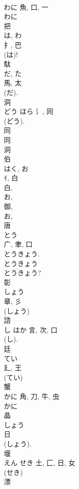 \documentclass[8pt]{extreport}
\begin{document}
\begin{CJK}{UTF8}{min}
\\	わに	魚, 口, 一		
\\	わに 
\\	把	
\\	は, わ	
\\	扌, 巴	
\\	(は)! 
\\	駄	
\\	だ, た	
\\	馬, 太	
\\	(だ).	
\\	洞	
\\	どう	ほら	氵, 同	
\\	(どう).	
\\	同 
\\	同 
\\	洞 
\\	伯	
\\	はく, お	
\\	ｲ, 白	
\\	白, 
\\	お, 
\\	御, 
\\	お, 
\\	唐	
\\	とう	
\\	广, 聿, 口	
\\	とうきょう. 
\\	とうきょう 
\\	とうきょう? 
\\	彰	
\\	しょう	
\\	章, 彡	
\\	(しょう) 
\\	諮	
\\	し	はか	言, 次, 口	
\\	(し).	
\\	廷	
\\	てい	
\\	廴, 王	
\\	(てい) 
\\	蟹	
\\	かに	角, 刀, 牛, 虫	
\\	かに 
\\	晶	
\\	しょう	
\\	日	
\\	(しょう).	
\\	堰	
\\	えん	せき	土, 匚, 日, 女	
\\	(せき) 
\\	漂	

\end{CJK}
\end{document}
